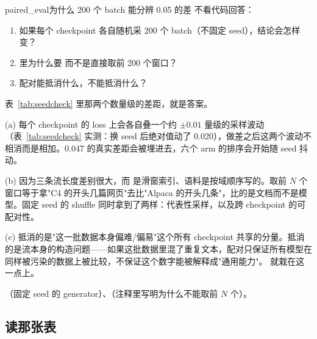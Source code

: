 \begin{checkpoint}{paired_eval}{为什么 200 个 batch 能分辨 0.05 的差}
不看代码回答：
\begin{enumerate}[label=(\alph*)]
  \item 如果每个 checkpoint 各自随机采 200 个 batch（不固定 seed），结论会怎样变？
  \item {} 里为什么要  而不是直接取前 200 个窗口？
  \item 配对能抵消什么，不能抵消什么？
\end{enumerate}
\hint 表~\ref{tab:seedcheck} 里那两个数量级的差距，就是答案。

\ifshowanswers
\tcblower
\answer (a) 每个 checkpoint 的 loss 上会各自叠一个约 $\pm 0.01$ 量级的采样波动（表~\ref{tab:seedcheck} 实测：换 seed 后绝对值动了 0.020），做差之后这两个波动不相消而是相加。0.047 的真实差距会被埋进去，六个 arm 的排序会开始随 seed 抖动。

(b) 因为三条流长度差别很大，而  是滑窗索引、语料是按域顺序写的。取前 $N$ 个窗口等于拿"C4 的开头几篇网页"去比"Alpaca 的开头几条"，比的是文档而不是模型。固定 seed 的 shuffle 同时拿到了两样：代表性采样，以及跨 checkpoint 的可配对性。

(c) 抵消的是"这一批数据本身偏难/偏易"这个所有 checkpoint 共享的分量。抵消的是流本身的构造问题——如果这批数据里混了重复文本，配对只保证所有模型在同样被污染的数据上被比较，不保证这个数字能被解释成"通用能力"。 就栽在这一点上。

\whereincode {}（固定 seed 的 generator）、（注释里写明为什么不能取前 $N$ 个）。
\fi
\end{checkpoint}

\subsection{读那张表}
\label{sec:b-sft-table}

